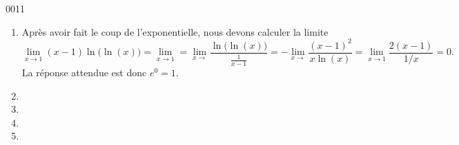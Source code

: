 \begin{corrige}{0011}
\begin{enumerate}
\item
Après avoir fait le coup de l'exponentielle, nous devons calculer la limite
\begin{equation}
	\lim_{x\to 1} (x-1)\ln\big( \ln(x) \big)=\lim_{x\to 1} =\lim_{x\to } \frac{ \ln\big( \ln(x) \big) }{ \frac{1}{ x-1 } }=-\lim_{x\to } \frac{ (x-1)^2 }{ x\ln(x) }=\lim_{x\to 1} \frac{ 2(x-1) }{ 1/x }=0.
\end{equation}
La réponse attendue est donc $ e^{0}=1$.

\item
\item
\item
\item


\end{enumerate}

\end{corrige}
